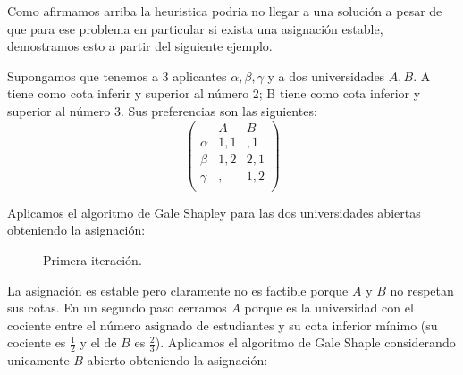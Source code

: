Como afirmamos arriba la heuristica podria no llegar a una solución a pesar de que para ese problema en particular si exista una asignación estable, demostramos esto a partir del siguiente ejemplo. 

\begin{eje} \cite{Todo}
Supongamos que tenemos a 3 aplicantes $\alpha,\beta,\gamma$ y a dos universidades $A,B$. A tiene como cota inferir y superior al número 2; B tiene como cota inferior y superior al número 3. Sus preferencias son las siguientes:
$$\begin{pmatrix}
& A & B \\
\alpha & 1,1 & ,1 \\
\beta & 1,2 & 2,1 \\ 
\gamma & , & 1,2 \\ 
\end{pmatrix}$$

Aplicamos el algoritmo de Gale Shapley para las dos universidades abiertas obteniendo la asignación:
\begin{figure}[H]\centering


\caption{Primera iteración.}
\end{figure}

La asignación es estable pero claramente no es factible porque  $A$ y $B$ no respetan sus cotas. En un segundo paso cerramos $A$ porque es la universidad con el cociente entre el número asignado de estudiantes y su cota inferior mínimo (su cociente es $\frac{1}{2}$ y el de $B$ es $\frac{2}{3}$). Aplicamos el algoritmo de Gale Shaple considerando unicamente $B$ abierto obteniendo la asignación:


\end{eje}
